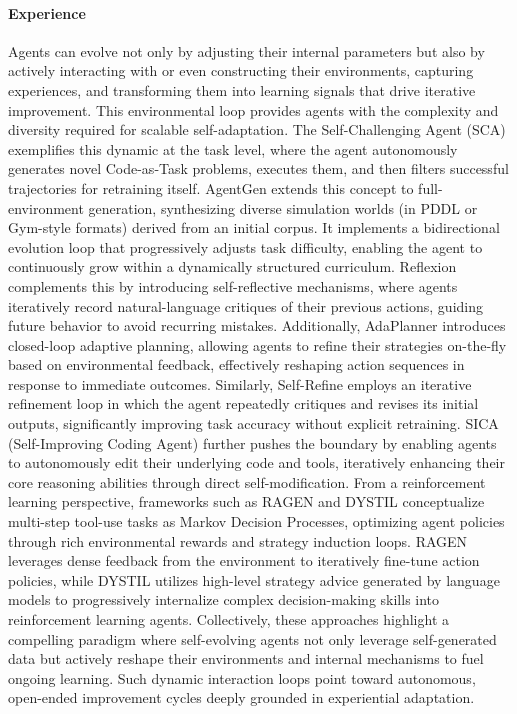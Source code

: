 \documentclass[10pt]{article} %
\begin{document}
\paragraph{Experience}
Agents can evolve not only by adjusting their internal parameters but also by actively interacting with or even constructing their environments, capturing experiences, and transforming them into learning signals that drive iterative improvement. This environmental loop provides agents with the complexity and diversity required for scalable self-adaptation.
The Self-Challenging Agent (SCA)\citep{zhou2025selfchallenginglanguagemodelagents} exemplifies this dynamic at the task level, where the agent autonomously generates novel Code-as-Task problems, executes them, and then filters successful trajectories for retraining itself. AgentGen\citep{hu2024agentgen} extends this concept to full-environment generation, synthesizing diverse simulation worlds (in PDDL or Gym-style formats) derived from an initial corpus. It implements a bidirectional evolution loop that progressively adjusts task difficulty, enabling the agent to continuously grow within a dynamically structured curriculum. Reflexion\citep{shinn2023reflexion} complements this by introducing self-reflective mechanisms, where agents iteratively record natural-language critiques of their previous actions, guiding future behavior to avoid recurring mistakes.
Additionally, AdaPlanner\citep{sun2023adaplanner} introduces closed-loop adaptive planning, allowing agents to refine their strategies on-the-fly based on environmental feedback, effectively reshaping action sequences in response to immediate outcomes. Similarly, Self-Refine\citep{madaan2023selfrefine} employs an iterative refinement loop in which the agent repeatedly critiques and revises its initial outputs, significantly improving task accuracy without explicit retraining. SICA (Self-Improving Coding Agent)\citep{robeyns2025selfimprovingcodingagent} further pushes the boundary by enabling agents to autonomously edit their underlying code and tools, iteratively enhancing their core reasoning abilities through direct self-modification.
From a reinforcement learning perspective, frameworks such as RAGEN\citep{wang2025ragen} and DYSTIL\citep{wang2025dystildynamicstrategyinduction} conceptualize multi-step tool-use tasks as Markov Decision Processes, optimizing agent policies through rich environmental rewards and strategy induction loops. RAGEN leverages dense feedback from the environment to iteratively fine-tune action policies, while DYSTIL utilizes high-level strategy advice generated by language models to progressively internalize complex decision-making skills into reinforcement learning agents.
Collectively, these approaches highlight a compelling paradigm where self-evolving agents not only leverage self-generated data but actively reshape their environments and internal mechanisms to fuel ongoing learning. Such dynamic interaction loops point toward autonomous, open-ended improvement cycles deeply grounded in experiential adaptation.
\end{document}
